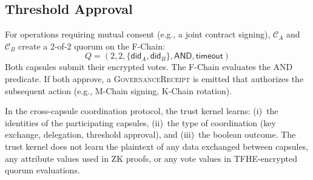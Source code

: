 \subsection{Threshold Approval}

For operations requiring mutual consent (e.g., a joint contract signing),
$\mathcal{C}_A$ and $\mathcal{C}_B$ create a 2-of-2 quorum on the F-Chain:
\[
    Q = (2, 2, \{\mathsf{did}_A, \mathsf{did}_B\}, \mathsf{AND}, \mathsf{timeout})
\]
Both capsules submit their encrypted votes. The F-Chain evaluates the AND
predicate. If both approve, a \textsc{GovernanceReceipt} is emitted that
authorizes the subsequent action (e.g., M-Chain signing, K-Chain rotation).

\begin{theorem}\label{thm:cross-capsule}
In the cross-capsule coordination protocol, the trust kernel learns:
(i)~the identities of the participating capsules, (ii)~the type of
coordination (key exchange, delegation, threshold approval), and
(iii)~the boolean outcome. The trust kernel does not learn the plaintext
of any data exchanged between capsules, any attribute values used in
ZK proofs, or any vote values in TFHE-encrypted quorum evaluations.
\end{theorem}

